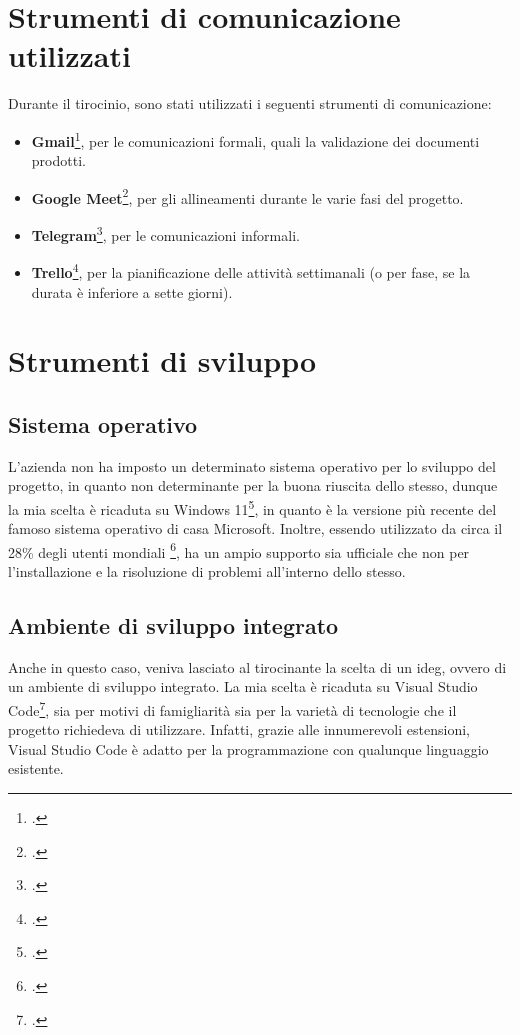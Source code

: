 \section{Strumenti di comunicazione utilizzati}

Durante il tirocinio, sono stati utilizzati i seguenti strumenti di comunicazione:
\begin{itemize}
    \item \textbf{Gmail}\footcite{site:gmail}, per le comunicazioni formali, quali la validazione dei documenti prodotti.
    \item \textbf{Google Meet}\footcite{site:meet}, per gli allineamenti durante le varie fasi del progetto.
    \item \textbf{Telegram}\footcite{site:telegram}, per le comunicazioni informali.
    \item \textbf{Trello}\footcite{site:trello}, per la pianificazione delle attività settimanali (o per fase, se la durata è inferiore a sette giorni).
\end{itemize}

\section{Strumenti di sviluppo}
\label{sec:sviluppoStrum}
\subsection{Sistema operativo}
L'azienda non ha imposto un determinato sistema operativo per lo sviluppo del progetto, in quanto non determinante per la buona riuscita dello stesso, dunque la mia scelta è ricaduta su Windows 11\footcite{site:w11}, in quanto è la versione più recente del famoso sistema operativo di casa Microsoft. Inoltre, essendo utilizzato da circa il 28\% degli utenti mondiali \footcite{site:statOS}, ha un ampio supporto sia ufficiale che non per l'installazione e la risoluzione di problemi all'interno dello stesso.
\subsection{Ambiente di sviluppo integrato}
Anche in questo caso, veniva lasciato al tirocinante la scelta di un \gls{ideg}, ovvero di un ambiente di sviluppo integrato. La mia scelta è ricaduta su Visual Studio Code\footcite{site:vscode}, sia per motivi di famigliarità sia per la varietà di tecnologie che il progetto richiedeva di utilizzare. Infatti, grazie alle innumerevoli estensioni, Visual Studio Code è adatto per la programmazione con qualunque linguaggio esistente.

